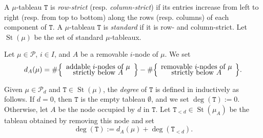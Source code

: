 \documentclass[twoside,11pt,reqno,letter]{amsart}
\numberwithin{equation}{section}
\theoremstyle{definition}  %
\newcommand\Comment[2][\relax]{\space\par\medskip\noindent%
   \fbox{\begin{minipage}{\textwidth}\textbf{Comment\ifx\relax#1\else---#1\fi}\newline%
        #2\end{minipage}}\medskip
}
\def\bi{\text{\boldmath$i$}}
\newcommand{\St}{\operatorname{St}}
\newcommand{\0}{{\bar 0}}
\newcommand{\1}{{\bar 1}}
\newcommand{\La}{\Lambda}
\newcommand{\al}{\alpha}
\newcommand\Par{\mathscr P}
\def\T{{\mathtt T}}
\newcommand\SetBox[2][35mm]{\Big\{\vcenter{\hsize#1\centering#2}\Big\}}
\begin{document}

A $\mu$-tableau $\T$ is {\em row-strict} (resp. {\em column-strict}) if its entries increase from left to right (resp. from top to bottom) along the rows (resp. columns) of each component of $\T$. 
A $\mu$-tableau $\T$ is {\em standard} if it is row- and column-strict. 
 Let $\St(\mu)$ be the set of standard $\mu$-tableaux.  


\iffalse
Let $\T$ be a $\mu$-tableau and suppose that $1\leq r\neq s\leq d$ and that $r=\T(a_1,b_1,m_1)$ and that
$s=\T(a_2,b_2,m_2)$. We write $r\nearrow_\T s$ if $m_1=m_2$, $a_1>a_2$, and $b_1<b_2$; informally, $r$ and $s$
are in the same component and~$s$ is strictly to the north-east of $r$ within that component.  The symbols $\rightarrow_\T,\searrow_\T,\downarrow_\T$ have the  similar obvious meanings. For example,
$r\downarrow_\T s$ means that $r$ and $s$ are located in the same column of the same component of~$\T$ and
that~$s$ is in a strictly lower row of~$\T$ than~$r$. 
\fi


Let $\mu\in\Par$, $i\in I$, and $A$ be a removable $i$-node
of $\mu$. We set
\begin{equation}\label{EDMUA}
d_A(\mu)=\#\SetBox{addable $i$-nodes of $\mu$\\[-4pt] strictly below $A$}
                -\#\SetBox[38mm]{removable $i$-nodes of $\mu$\\[-4pt] strictly below $A$}.
\end{equation}



Given $\mu \in \Par_d$ and $\T \in \St(\mu)$, the {\em degree} of $\T$ is defined in
\cite[section~3.5]{BKW} inductively as follows. If $d=0$, then $\T$ is the empty tableau $\emptyset$, and
we set $\deg(\T):=0$.  Otherwise, let $A$ be the node occupied by $d$ in $\T$. Let $\T_{<d}\in\St(\mu_A)$
be the tableau obtained by removing this node and set
\begin{equation}\label{EDegTab}
\deg(\T):=d_A(\mu)+\deg(\T_{<d}).
\end{equation}
\end{document}
